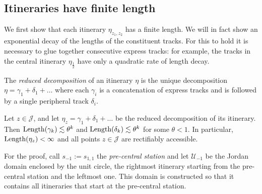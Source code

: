 \subsection{Itineraries have finite length}
We first show that each itinerary $\eta_{z_1,z_2}$ has a finite length. We will in fact show an exponential decay of the lengths of the constituent tracks. For this to hold it is necessary to glue together consecutive express tracks: for example, the tracks in the central itinerary $\eta_{\tfrac 12}$ have only a quadratic rate of length decay.

\begin{definition}
	The \emph{reduced decomposition} of an itinerary $\eta$ is the unique decomposition $\eta=\gamma_1 + \delta_1 + \dots$ where each $\gamma_i$ is a concatenation of express tracks and is followed by a single peripheral track $\delta_i$.
\end{definition}

\begin{comment}
The following definition is used in the proof of \cref{prop:finite-length}.
\begin{definition}
	The \emph{shadow} of a station $s$ is the set of all terminals $z\in \mathcal J$ that are the endpoints of itineraries starting at $s$.
\end{definition}

Using this definition, we claim:
\end{comment}


\begin{proposition} \label{prop:finite-length}
	Let $z \in \mathcal J$, and let $\eta_z= \gamma_1 + \delta_1 + \dots  $ be the reduced decomposition of its itinerary. Then $\operatorname{Length}(\gamma_k)\lesssim \theta^k$ and $\operatorname{Length}(\delta_k)\lesssim \theta^k$ for some $\theta < 1$. In particular, $\operatorname{Length}(\eta_z)<\infty$ and all points $z\mathcal \in \mathcal J$ are rectifiably accessible.
\end{proposition}

For the proof, call $s_{-1}:=s_{1,1}$ the \emph{pre-central station} and let $\mathcal U_{-1}$ be the Jordan domain enclosed by the unit circle, the rightmost itinerary starting from the pre-central station and the leftmost one. This domain is constructed so that it contains all itineraries that start at the pre-central station.  
\begin{comment}
We call an itinerary \emph{non-positive} if it is not contained in the positive real axis.
\end{comment}

